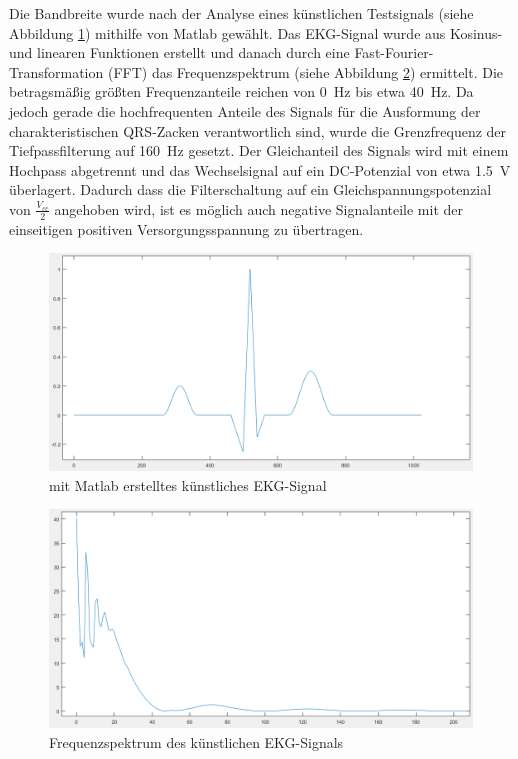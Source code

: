 Die Bandbreite wurde nach der Analyse eines künstlichen Testsignals (siehe Abbildung \ref{fig_Matlab EKG-Signal}) mithilfe von Matlab gewählt. Das EKG-Signal wurde aus Kosinus- und linearen Funktionen erstellt und danach durch eine Fast-Fourier-Transformation (FFT) das Frequenzspektrum (siehe Abbildung \ref{fig_Matlab Frequenzspektrum}) ermittelt. Die betragsmäßig größten Frequenzanteile reichen von \SI{0}{\hertz} bis etwa \SI{40}{\hertz}. Da jedoch gerade die hochfrequenten Anteile des Signals für die Ausformung der charakteristischen QRS-Zacken verantwortlich sind, wurde die Grenzfrequenz der Tiefpassfilterung auf \SI{160}{\hertz} gesetzt. Der Gleichanteil des Signals wird mit einem Hochpass abgetrennt und das Wechselsignal auf ein DC-Potenzial von etwa \SI{1,5}{\volt} überlagert. Dadurch dass die Filterschaltung auf ein Gleichspannungspotenzial von $\frac{V_{cc}}{2}$ angehoben wird, ist es möglich auch negative Signalanteile mit der einseitigen positiven Versorgungsspannung zu übertragen.

\begin{figure} [!h]
	\includegraphics[width=\textwidth] {EKG_Signal.png}
	\caption{mit Matlab erstelltes künstliches EKG-Signal}
	\label{fig_Matlab EKG-Signal} 
\end{figure}

\begin{figure} [!h]
	\includegraphics[width=\textwidth] {EKG_diskretes_Frequenzspektrum_Ausschnitt.png}
	\caption{Frequenzspektrum des künstlichen EKG-Signals}
	\label{fig_Matlab Frequenzspektrum} 
\end{figure}

